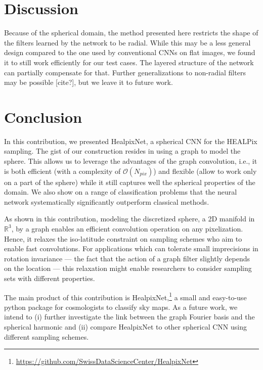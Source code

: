 \documentclass[final,twocolumn,3p,times,authoryear]{elsarticle}
\newcommand{\nati}[1]{{\color[rgb]{.1,.6,.1}{#1}}}
\newcommand{\1}{\b{1}}              %
\newcommand{\0}{\b{0}}              %
\newcommand{\R}{\mathbb{R}}
\begin{document}
\section{Discussion}

Because of the spherical domain, the method presented here restricts the shape of the filters learned by the network to be radial.
While this may be a less general design compared to the one used by conventional CNNs on flat images, we found it to still work efficiently for our test cases.
The layered structure of the network can partially compensate for that.
Further generalizations to non-radial filters may be possible [cite?], but we leave it to future work.

\nati{Should the discussion be merged with the result section?}

\section{Conclusion}
\label{sec:conclusion}

In this contribution, we presented HealpixNet, a spherical CNN for the HEALPix sampling. The gist of our construction resides in using a graph to model the sphere.
This allows us to leverage the advantages of the graph convolution, i.e., it is both efficient (with a complexity of $\mathcal{O}(N_{pix})$) and flexible (allow to work only on a part of the sphere) while it still captures well the spherical properties of the domain.
We also show on a range of classification problems that the neural network systematically significantly outperform classical methods.

As shown in this contribution, modeling the discretized sphere, a 2D manifold in $\R^3$, by a graph enables an efficient convolution operation on any pixelization. Hence, it relaxes the iso-latitude constraint on sampling schemes who aim to enable fast convolutions. For applications which can tolerate small imprecisions in rotation invariance --- the fact that the action of a graph filter slightly depends on the location --- this relaxation might enable researchers to consider sampling sets with different properties.

The main product of this contribution is HealpixNet,\footnote{\url{https://github.com/SwissDataScienceCenter/HealpixNet}} a small and easy-to-use python package for cosmologists to classify sky maps.
As a future work, we intend to (i) further investigate the link between the graph Fourier basis and the spherical harmonic and (ii) compare HealpixNet to other spherical CNN using different sampling schemes.
\end{document}
